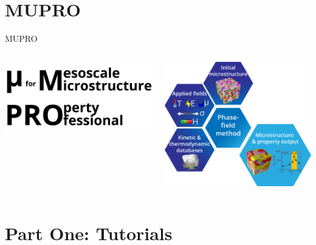 \documentclass[11pt,aspectratio=169]{beamer}
\begin{document}
\section[MUPRO]{MUPRO}
\begin{frame}{MUPRO}
\begin{columns}
\includegraphics[width=\textwidth]{img/text.png}
\begin{center}
\includegraphics[width=\textwidth]{img/phase-field.png}
\end{center}
\end{columns}
\end{frame}

\section[Part One: Tutorials]{Part One: Tutorials}
\end{document}
